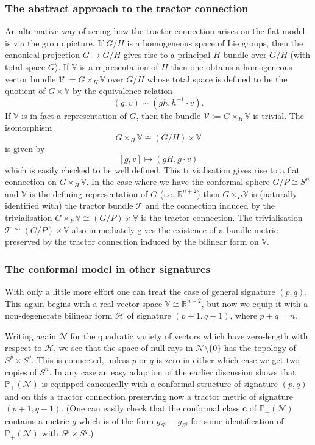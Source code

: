 \documentclass[a4paper,12pt]{amsart}
\newcommand{\cc}{\boldsymbol{c}}
\newcommand{\cT}{{\mathcal T}}
\def\cV{\mathcal{V}}
\def\cH{\mathcal{H}}
\def\cN{\mathcal{N}}
\newcommand{\bV}{\mathbb{V}}
\theoremstyle{remark}
\begin{document}
\subsubsection{The abstract approach to the tractor connection}
An alternative way of seeing how the tractor connection arises on the flat model is via the group picture. If $G/H$ is a homogeneous space of Lie groups, then the canonical projection $G\rightarrow G/H$ gives rise to a principal $H$-bundle over $G/H$ (with total space $G$). If $\bV$ is a representation of $H$ then one obtains a homogeneous vector bundle $\cV:=G\times_H \bV$ over $G/H$ whose total space is defined to be the quotient of $G\times \bV$ by the equivalence relation
$$
(g,v) \sim (gh,h^{-1}\cdot v).
$$
If $\bV$ is in fact a representation of $G$, then the bundle $\cV:=G\times_H \bV$ is trivial. The isomorphism
$$
G\times_H \bV \cong (G/H)\times \bV
$$
is given by
$$
[g,v]\mapsto (gH,g\cdot v)
$$
which is easily checked to be well defined. This trivialisation gives rise to a flat connection on $G\times_H \bV$. In the case where we have the conformal sphere $G/P\cong S^n$ and $\bV$ is the defining representation of $G$ (i.e. $\mathbb{R}^{n+2}$) then $G\times_P \bV$ is (naturally identified with) the tractor bundle $\cT$ and the connection induced by the trivialisation $G\times_P \bV \cong (G/P)\times \bV$ is the tractor connection. The trivialisation $\cT \cong (G/P)\times \bV$ also immediately gives the existence of a bundle metric preserved by the tractor connection induced by the bilinear form on $\bV$.


\subsubsection{The conformal model in other signatures} \label{modelOS}
With only a little more effort one can treat the case of general
signature $(p,q)$.  This again begins with a real vector space
$\bV\cong \mathbb{R}^{n+2}$, but now we equip it with a non-degenerate
bilinear form $\mathcal{H}$ of signature $(p+1,q+1)$, where $p+q=n$. 

Writing again $\cN$ for the quadratic variety of vectors which have
zero-length with respect to $\cH$, we see that the space of null rays
in $\cN\setminus \{0 \}$ has the topology of $S^p\times S^q$. This is connected, unless $p$ or $q$ is zero in either which case we get two copies of $S^n$. In any case an easy adaption of the earlier discussion shows that $\mathbb{P}_+(\cN)$ is equipped canonically with a conformal structure of signature $(p,q)$ and on this a tractor connection preserving now a tractor metric of signature $(p+1,q+1)$. (One can easily check that the conformal class $\cc$ of $\mathbb{P}_+(\cN)$ contains a metric $g$ which is of the form $g_{S^p}-g_{S^q}$ for some identification of $\mathbb{P}_+(\cN)$ with $S^p\times S^q$.)
\end{document}

